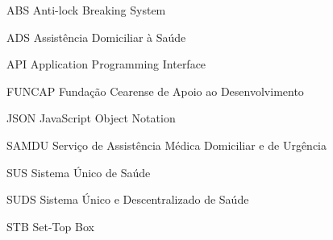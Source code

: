 \begin{siglas}
  \item[ABS] Anti-lock Breaking System
  \item[ADS] Assistência Domiciliar à Saúde 
  \item[API] Application Programming Interface
  \item[FUNCAP] Fundação Cearense de Apoio ao Desenvolvimento
  \item[JSON] JavaScript Object Notation
  \item[SAMDU] Serviço de Assistência Médica Domiciliar e de Urgência 
  \item[SUS] Sistema Único de Saúde 
  \item[SUDS] Sistema Único e Descentralizado de Saúde 
  \item[STB] Set-Top Box
\end{siglas}
